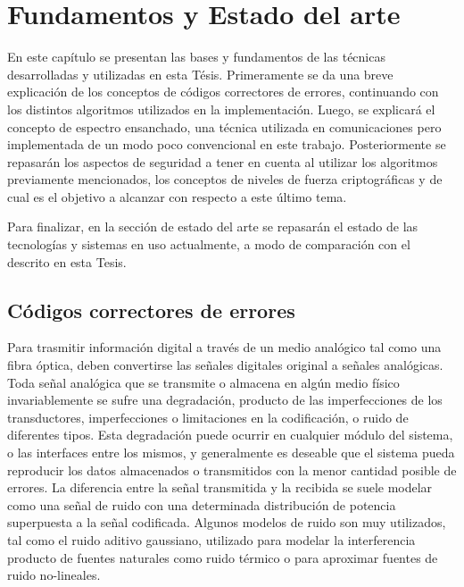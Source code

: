 \chapter{Fundamentos y Estado del arte}

En este capítulo se presentan las bases y fundamentos de las técnicas desarrolladas y utilizadas en esta Tésis. 
Primeramente se da una breve explicación de los conceptos de códigos correctores de errores, continuando con los distintos algoritmos utilizados en la implementación. Luego, se explicará el concepto de espectro ensanchado, una técnica utilizada en comunicaciones pero implementada de un modo poco convencional en este trabajo. Posteriormente se repasarán los aspectos de seguridad a tener en cuenta al utilizar los algoritmos previamente mencionados, los conceptos de niveles de fuerza criptográficas y de cual es el objetivo a alcanzar con respecto a este último tema.

Para finalizar, en la sección de estado del arte se repasarán el estado de las tecnologías y sistemas en uso actualmente, a modo de comparación con el descrito en esta Tesis.

\section{Códigos correctores de errores}
\label{cap2:ECC}
Para trasmitir información digital a través de un medio analógico tal como una fibra óptica, deben convertirse las señales digitales original a señales analógicas.
Toda señal analógica que se transmite o almacena en algún medio físico invariablemente se sufre una degradación, producto de las imperfecciones de los transductores, imperfecciones o limitaciones en la codificación, o ruido de diferentes tipos. Esta degradación puede ocurrir en cualquier módulo del sistema, o las interfaces entre los mismos, y generalmente es deseable que el sistema pueda reproducir los datos almacenados o transmitidos con la menor cantidad posible de errores. La diferencia entre la señal transmitida y la recibida se suele modelar como una señal de ruido con una determinada distribución de potencia superpuesta a la señal codificada. Algunos modelos de ruido son muy utilizados, tal como el ruido aditivo gaussiano, utilizado para modelar la interferencia producto de fuentes naturales como ruido térmico o para aproximar fuentes de ruido no-lineales.

